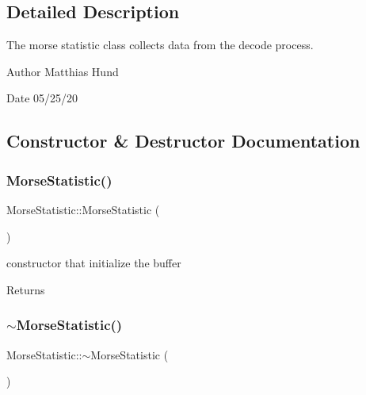 \subsection{Detailed Description}
The morse statistic class collects data from the decode process. 

\begin{DoxyAuthor}{Author}
Matthias Hund 
\end{DoxyAuthor}
\begin{DoxyDate}{Date}
05/25/20 
\end{DoxyDate}


\subsection{Constructor \& Destructor Documentation}
\mbox{\label{classMorseStatistic_a48a3dc7e8f56e32caa91689593b07cff}} 
\subsubsection{\texorpdfstring{Morse\+Statistic()}{MorseStatistic()}}
{\footnotesize\ttfamily Morse\+Statistic\+::\+Morse\+Statistic (\begin{DoxyParamCaption}{ }\end{DoxyParamCaption})}



constructor that initialize the buffer 

\begin{DoxyReturn}{Returns}

\end{DoxyReturn}
\mbox{\label{classMorseStatistic_a9eb933dcacfbc2e124208f901faba46d}} 
\subsubsection{\texorpdfstring{$\sim$\+Morse\+Statistic()}{~MorseStatistic()}}
{\footnotesize\ttfamily Morse\+Statistic\+::$\sim$\+Morse\+Statistic (\begin{DoxyParamCaption}{ }\end{DoxyParamCaption})\hspace{0.3cm}{\ttfamily [virtual]}}



